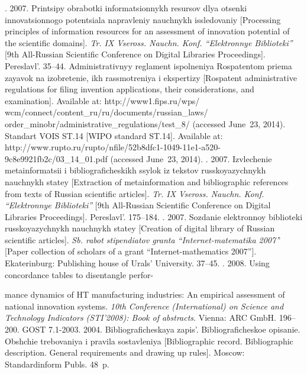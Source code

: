 \begin{multicols}{2}
{{\begin{thebibliography}{99}
. 2007. Printsipy obrabotki
informatsionnykh resursov dlya otsenki innova\-tsi\-on\-no\-go potentsiala napravleniy
nauchnykh issledovaniy [Processing principles of information resources for an
assessment of innovation potential of the scientific domains].
\textit{Tr. IX Vseross. Nauchn. Konf. ``Elektronnye Biblioteki''} [9th All-Russian
Scientific Conference on Digital Libraries Proceedings]. Pereslavl'. 35--44.
Administrativnyy reglament ispolneniya Rospatentom priema zayavok na izobretenie,
ikh rassmotreniya i ekspertizy [Rospatent administrative regulations for filing invention
applications, their considerations, and examination]. Available at: {\sf
http://www1.fips.ru/wps/ wcm/connect/content\_ru/ru/documents/russian\_laws/ order\_minobr/administrative\_regulations/test\_8/} (accessed June~23, 2014).
Standart VOIS ST.14 [WIPO standard ST.14]. Available at: {\sf
http://www.rupto.ru/rupto/nfile/52b8dfc1-1049-11e1-a520-9c8e9921fb2c/03\_14\_01.pdf} (accessed June~23, 2014).
. 2007. Izvlechenie
metainformatsii i bibliograficheskikh ssylok iz tekstov russkoyazychnykh nauchnykh
statey [Extraction of metainformation and bibliographic references from texts of
Russian scientific articles]. \textit{Tr. IX Vseross. Nauchn. Konf. ``Elektronnye
Biblioteki''} [9th All-Russian Scientific Conference on Digital
Libraries Proceedings]. Pereslavl'. 175--184.
. 2007. Sozdanie
elektronnoy biblioteki russkoyazychnykh nauchnykh statey [Creation of digital library
of Russian scientific articles]. \textit{Sb. rabot stipendiatov granta
``Internet-matematika 2007'}' [Paper collection of scholars of a grant
``Internet-mathematics 2007'']. Ekaterinburg: Publishing house of Urals' University.
37--45.
. 2008. Using
concordance tables to disentangle perfor-\linebreak\vspace*{-12pt}

\pagebreak

\noindent
mance dynamics of HT manufacturing
industries: An
 empirical assessment of national innovation systems. \textit{10th
Conference (International)  on Science and Technology Indicators (STI'2008): Book of abstracts}. Vienna: ARC GmbH. 196--200.
GOST 7.1-2003. 2004. Bibliograficheskaya zapis'. Bibliograficheskoe opisanie.
Obshchie trebovaniya i pravila sostavleniya [Bibliographic record. Bibliographic
description. General requirements and drawing up rules]. Moscow: Standardinform
Publs. 48~p.

\end{thebibliography}
} }


\end{multicols}

